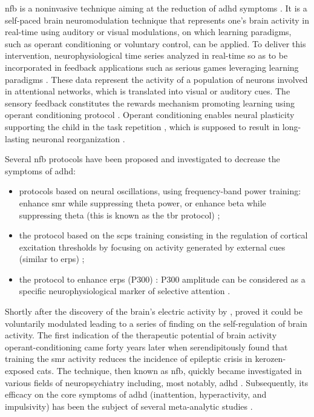 \gls{nfb} is a noninvasive technique aiming at the reduction of \gls{adhd} symptoms \citep{Arns2015, Steffert2010,
Marzbani2016}. It is a self-paced brain neuromodulation technique that represents one's brain activity in real-time
using auditory or visual modulations, on which learning paradigms, such as operant conditioning
\citep{Reynolds1975} or voluntary control, can be applied. To deliver this intervention, neurophysiological time series 
analyzed in real-time so as to be incorporated in feedback applications such as serious games leveraging learning paradigms \citep{Wang2010}. 
These data represent the activity of a population of neurons involved in attentional networks, which is translated into 
visual or auditory cues. The sensory feedback constitutes the rewards mechanism promoting learning using operant conditioning 
protocol \citep{Sherlin2011}. Operant conditioning enables neural plasticity supporting the child in the task repetition \citep{Skinner1961}, 
which is supposed to result in long-lasting neuronal reorganization \citep{VanDoren2017}. 

Several \gls{nfb} protocols have been proposed and investigated to decrease the symptoms of \gls{adhd}:
\begin{itemize} 
  \item protocols based on neural oscillations, using frequency-band power training: enhance \gls{smr} while
    suppressing theta power, or enhance beta while suppressing theta (this is known as
    the \gls{tbr} protocol) \citep{Lubar1976, Arns2013}; 
  \item the protocol based on the \glspl{scp} training consisting in the regulation of
    cortical excitation thresholds by focusing on activity generated by external cues (similar to \glspl{erp})
    \citep{Heinrich2004, Banaschewski2007}; 
  \item the protocol to enhance \glspl{erp} (P300) \citep{Fouillen2017}: P300 amplitude can be considered as a specific
    neurophysiological marker of selective attention \citep{RolandLeBouedec}.  
\end{itemize} 

Shortly after the discovery of the brain's electric activity by \citet{Berger1929}, \citet{Durup1935} proved it could be
voluntarily modulated leading to a series of finding on the self-regulation of brain activity. The first indication of the
therapeutic potential of brain activity operant-conditioning came forty years later when \citet{Sterman1974} serendipitously 
found that training the \gls{smr} activity reduces the incidence of epileptic crisis in kerozen-exposed cats. The technique, 
then known as \gls{nfb}, quickly became investigated in various fields of neuropsychiatry including, most notably, \gls{adhd} 
\citep{Lubar1976, Rossiter1995, Linden1996, Maurizio2014}. Subsequently, its efficacy on the core symptoms of \gls{adhd} 
(inattention, hyperactivity, and impulsivity) has been the subject of several meta-analytic studies \citep{Loo2005, Lofthouse2012, 
Arns2009, Micoulaud2014, Sonuga-Barke2013}. 

